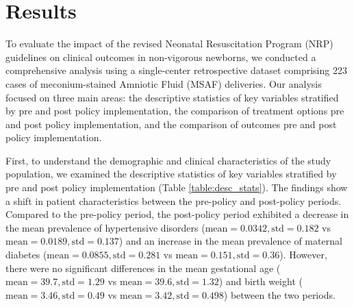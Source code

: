 \documentclass[11pt]{article}
\begin{document}
\section*{Results}

To evaluate the impact of the revised Neonatal Resuscitation Program (NRP) guidelines on clinical outcomes in non-vigorous newborns, we conducted a comprehensive analysis using a single-center retrospective dataset comprising 223 cases of meconium-stained Amniotic Fluid (MSAF) deliveries. Our analysis focused on three main areas: the descriptive statistics of key variables stratified by pre and post policy implementation, the comparison of treatment options pre and post policy implementation, and the comparison of outcomes pre and post policy implementation.

First, to understand the demographic and clinical characteristics of the study population, we examined the descriptive statistics of key variables stratified by pre and post policy implementation (Table {}\ref{table:desc_stats}). The findings show a shift in patient characteristics between the pre-policy and post-policy periods. Compared to the pre-policy period, the post-policy period exhibited a decrease in the mean prevalence of hypertensive disorders (\(\text{mean} = 0.0342, \text{std} = 0.182\) vs \(\text{mean} = 0.0189, \text{std} = 0.137\)) and an increase in the mean prevalence of maternal diabetes (\(\text{mean} = 0.0855, \text{std} = 0.281\) vs \(\text{mean} = 0.151, \text{std} = 0.36\)). However, there were no significant differences in the mean gestational age (\(\text{mean} = 39.7, \text{std} = 1.29\) vs \(\text{mean} = 39.6, \text{std} = 1.32\)) and birth weight (\(\text{mean} = 3.46, \text{std} = 0.49\) vs \(\text{mean} = 3.42, \text{std} = 0.498\)) between the two periods.
\end{document}
